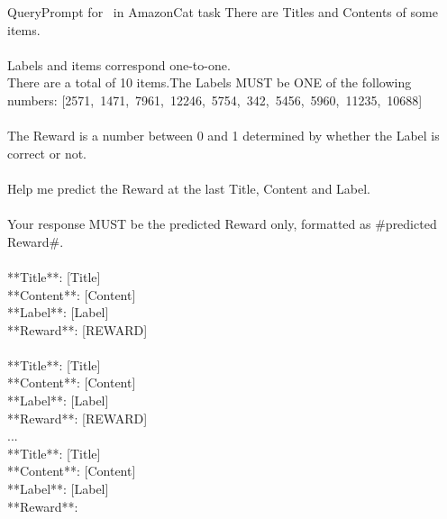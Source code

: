 \begin{mycolorbox}{Query}{Prompt for \algts~in AmazonCat task}
\small
There are Titles and Contents of some items. \\\\
Labels and items correspond one-to-one.\\
There are a total of 10 items.The Labels MUST be ONE of the following numbers: \mbox{[2571, 1471, 7961, 12246, 5754, 342, 5456, 5960, 11235, 10688]}\\\\
The Reward is a number between 0 and 1 determined by whether the Label is correct or not.\\\\
Help me predict the Reward at the last Title, Content and Label.\\\\
Your response MUST be the predicted Reward only, formatted as \#predicted Reward\#.\\\\
**Title**: \mbox{[Title]}\\
**Content**: \mbox{[Content]}\\
**Label**: \mbox{[Label]}\\
**Reward**: \mbox{[REWARD]}\\\\
**Title**: \mbox{[Title]}\\
**Content**: \mbox{[Content]}\\
**Label**: \mbox{[Label]}\\
**Reward**: \mbox{[REWARD]}\\

...\\

**Title**: \mbox{[Title]}\\
**Content**: \mbox{[Content]}\\
**Label**: \mbox{[Label]}\\
**Reward**:
\end{mycolorbox}


